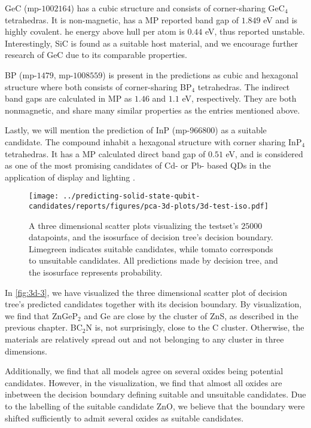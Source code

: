 GeC (mp-$1002164$) \cite{GeC} has a cubic structure and consists of corner-sharing GeC$_4$ tetrahedras. It is non-magnetic, has a MP reported band gap of $1.849$ eV and is highly covalent. he energy above hull per atom is $0.44$ eV, thus reported unstable. Interestingly, SiC is found as a suitable host material, and we encourage further research of GeC due to its comparable properties.

BP (mp-$1479$, mp-$1008559$) is present in the predictions as cubic \cite{BP1} and hexagonal \cite{BP2} structure where both consists of corner-sharing BP$_4$ tetrahedras. The indirect band gaps are calculated in MP as $1.46$ and $1.1$ eV, respectively. They are both nonmagnetic, and share many similar properties as the entries mentioned above.

Lastly, we will mention the prediction of InP (mp-$966800$) \cite{InP} as a suitable candidate. The compound inhabit a hexagonal structure with corner sharing InP$_4$ tetrahedras. It has a MP calculated direct band gap of $0.51$ eV, and is considered as one of the most promising candidates of Cd- or Pb- based QDs in the application of display and lighting \cite{Zhang2020a, Won2019}.

\begin{figure}[ht!]
    \centering
    \texttt{[image: ../predicting-solid-state-qubit-candidates/reports/figures/pca-3d-plots/3d-test-iso.pdf]}
    \vspace*{-130mm}
    \caption{A three dimensional scatter plots visualizing the testset's $25000$ datapoints, and the isosurface of decision tree's decision boundary. Limegreen indicates suitable candidates, while tomato corresponds to unsuitable candidates. All predictions made by decision tree, and the isosurface represents probability.}
    \label{fig:3d-3}
\end{figure}

In \autoref{fig:3d-3}, we have visualized the three dimensional scatter plot of decision tree's predicted candidates together with its decision boundary. By visualization, we find that ZnGeP$_2$ and Ge are close by the cluster of ZnS, as described in the previous chapter. BC$_2$N is, not surprisingly, close to the C cluster. Otherwise, the materials are relatively spread out and not belonging to any cluster in three dimensions.

Additionally, we find that all models agree on several oxides being potential candidates. However, in the visualization, we find that almost all oxides are inbetween the decision boundary defining suitable and unsuitable candidates. Due to the labelling of the suitable candidate ZnO, we believe that the boundary were shifted sufficiently to admit several oxides as suitable candidates.



